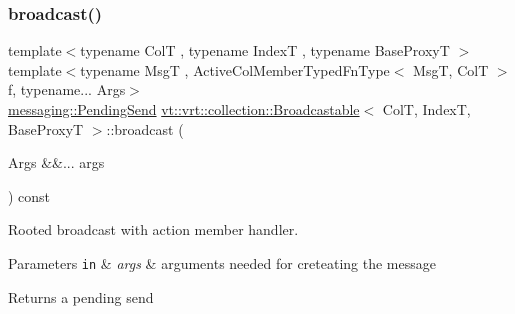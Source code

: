 \mbox{\label{structvt_1_1vrt_1_1collection_1_1_broadcastable_a96cd21a1be6313144a8c4aa3683eaa05}} 
\subsubsection{\texorpdfstring{broadcast()}{broadcast()}\hspace{0.1cm}{\footnotesize\ttfamily [6/7]}}
{\footnotesize\ttfamily template$<$typename ColT , typename IndexT , typename Base\+ProxyT $>$ \\
template$<$typename MsgT , Active\+Col\+Member\+Typed\+Fn\+Type$<$ Msg\+T, Col\+T $>$ f, typename... Args$>$ \\
\hyperlink{structvt_1_1messaging_1_1_pending_send}{messaging\+::\+Pending\+Send} \hyperlink{structvt_1_1vrt_1_1collection_1_1_broadcastable}{vt\+::vrt\+::collection\+::\+Broadcastable}$<$ ColT, IndexT, Base\+ProxyT $>$\+::broadcast (\begin{DoxyParamCaption}\item[{Args \&\&...}]{args }\end{DoxyParamCaption}) const}



Rooted broadcast with action member handler. 


\begin{DoxyParams}[1]{Parameters}
\mbox{\tt in}  & {\em args} & arguments needed for creteating the message\\
\hline
\end{DoxyParams}
\begin{DoxyReturn}{Returns}
a pending send 
\end{DoxyReturn}
\mbox{\label{structvt_1_1vrt_1_1collection_1_1_broadcastable_af8df39dc496fd4caffd029a714369610}} 
